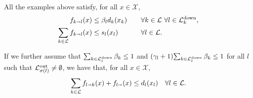\documentclass[letterpaper, 10 pt, conference]{ieeeconf}
\newcommand{\sra}{\shortrightarrow}
\newcommand{\fluxin}{s}
\newcommand{\fluxout}{d}
\newcommand{\Links}{\mathcal{L}}
\newcommand{\Lout}{\mathcal{L}^\textnormal{out}}
\newcommand{\Ldown}{\mathcal{L}^\textnormal{down}}
\newcommand{\head}{{\sigma}}
\newcommand{\Domain}{\mathcal{X}}
\newcommand{\Dom}{\mathcal{X}}
\newcommand{\flow}{f}
\begin{document}
All the examples above satisfy, for all $x\in\Domain$,
\begin{alignat}{2}
  \label{eq:51}
  \flow_{k\sra l}(x)&\leq \beta_l\fluxout_k(x_k)&&\quad \forall k\in\Links \ \forall l\in\Ldown_k,\\
  \sum_{k\in\Links}\flow_{k\sra l}(x)&\leq \fluxin_l(x_l)&&\quad  \forall l\in\Links.
\end{alignat}

If we further assume that $\sum_{k\in\Ldown_l}\beta_k\leq 1$ and 
$(\gamma_l+1){\sum_{k\in\Ldown_l}\beta_k}\leq 1$
for all $l$ such that $\Lout_{\head(l)}\neq \emptyset$, we have that, for all $x\in\Dom$,
\begin{align}
  \label{eq:52}
  \sum_{k\in\Links}\flow_{l\sra k}(x)+\flow_{l\sra}(x)\leq d_l(x_l) \quad \forall  l\in\Links.
\end{align}
\end{document}
